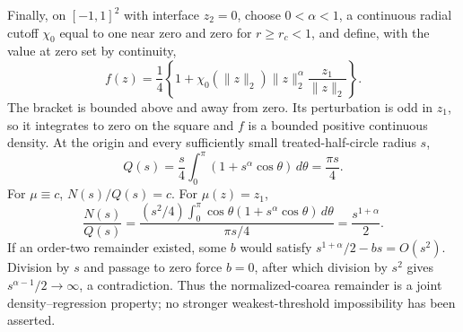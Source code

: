 Finally, on \([-1,1]^2\) with interface \(z_2=0\), choose \(0<\alpha<1\), a continuous radial cutoff \(\chi_0\) equal to one near zero and zero for \(r\geq r_c<1\), and define, with the value at zero set by continuity,
\[
 f(z)=\frac14\left\{1+\chi_0(\lVert z\rVert_2)
 \lVert z\rVert_2^\alpha\frac{z_1}{\lVert z\rVert_2}\right\}.
\]
The bracket is bounded above and away from zero.  Its perturbation is odd in \(z_1\), so it integrates to zero on the square and \(f\) is a bounded positive continuous density.  At the origin and every sufficiently small treated-half-circle radius \(s\),
\[
 Q(s)=\frac{s}{4}\int_0^\pi(1+s^\alpha\cos\theta)\,d\theta
 =\frac{\pi s}{4}.
\]
For \(\mu\equiv c\), \(N(s)/Q(s)=c\).  For \(\mu(z)=z_1\),
\[
 \frac{N(s)}{Q(s)}
 =\frac{(s^2/4)\int_0^\pi\cos\theta(1+s^\alpha\cos\theta)\,d\theta}
 {\pi s/4}
 =\frac{s^{1+\alpha}}2.
\]
If an order-two remainder existed, some \(b\) would satisfy \(s^{1+\alpha}/2-bs=O(s^2)\).  Division by \(s\) and passage to zero force \(b=0\), after which division by \(s^2\) gives \(s^{\alpha-1}/2\to\infty\), a contradiction.  Thus the normalized-coarea remainder is a joint density--regression property; no stronger weakest-threshold impossibility has been asserted.